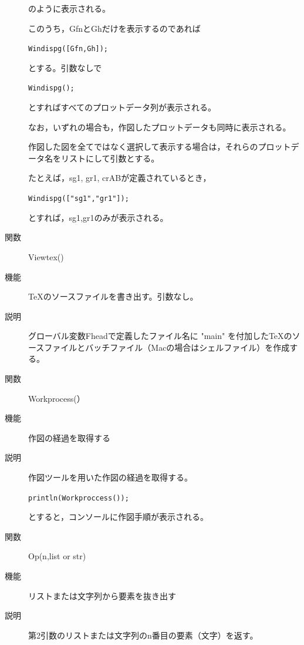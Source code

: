 \documentclass[papersize,a4paper,12pt,uplatex]{jsarticle}
\begin{document}
\begin{description}
のように表示される。

このうち，GfnとGhだけを表示するのであれば

\hspace{10mm}\verb|Windispg([Gfn,Gh]);|

とする。引数なしで
 
\hspace{10mm}\verb|Windispg();|

とすればすべてのプロットデータ列が表示される。

なお，いずれの場合も，作図したプロットデータも同時に表示される。

作図した図を全てではなく選択して表示する場合は，それらのプロットデータ名をリストにして引数とする。

たとえば，sg1, gr1, crABが定義されているとき，

\hspace{10mm}\verb|Windispg(["sg1","gr1"]);|

とすれば，sg1,gr1のみが表示される。


\vspace{\baselineskip}
\hypertarget{viewtex}{}
\item[関数]Viewtex()
\item[機能]\TeX のソースファイルを書き出す。引数なし。
\item[説明]グローバル変数Fheadで定義したファイル名に "main" を付加した\TeX のソースファイルとバッチファイル（Macの場合はシェルファイル）を作成する。
 
\vspace{\baselineskip}
\hypertarget{workprocess}{}
\item[関数]Workprocess(）
\item[機能]作図の経過を取得する
\item[説明]作図ツールを用いた作図の経過を取得する。

\verb|println(Workproccess());|

とすると，コンソールに作図手順が表示される。

\vspace{\baselineskip}
\hypertarget{op}{}
\item[関数]Op(n,list or str)
\item[機能]リストまたは文字列から要素を抜き出す
\item[説明]第2引数のリストまたは文字列のn番目の要素（文字）を返す。


\end{description}
\end{document}
